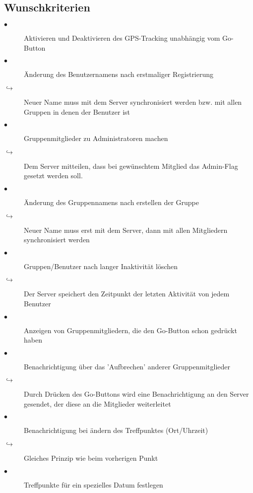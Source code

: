 \subsection{Wunschkriterien}
\begin{description}
\item[$\bullet$] Aktivieren und Deaktivieren des GPS-Tracking unabhängig vom Go-Button
\item[$\bullet$] Änderung des Benutzernamens nach erstmaliger Registrierung
\item[$\hookrightarrow$] Neuer Name muss mit dem Server synchronisiert werden bzw. mit allen Gruppen in denen der Benutzer ist
\item[$\bullet$] Gruppenmitglieder zu Administratoren machen
\item[$\hookrightarrow$] Dem Server mitteilen, dass bei gewünschtem Mitglied das Admin-Flag gesetzt werden soll.
\item[$\bullet$] Änderung des Gruppennamens nach erstellen der Gruppe
\item[$\hookrightarrow$] Neuer Name muss erst mit dem Server, dann mit allen Mitgliedern synchronisiert werden
\item[$\bullet$] Gruppen/Benutzer nach langer Inaktivität löschen
\item[$\hookrightarrow$] Der Server speichert den Zeitpunkt der letzten Aktivität von jedem Benutzer
\item[$\bullet$] Anzeigen von Gruppenmitgliedern, die den Go-Button schon gedrückt haben
\item[$\bullet$] Benachrichtigung über das 'Aufbrechen' anderer Gruppenmitglieder
\item[$\hookrightarrow$] Durch Drücken des Go-Buttons wird eine Benachrichtigung an den Server gesendet, der diese an die Mitglieder weiterleitet
\item[$\bullet$] Benachrichtigung bei ändern des Treffpunktes (Ort/Uhrzeit)
\item[$\hookrightarrow$] Gleiches Prinzip wie beim vorherigen Punkt
\item[$\bullet$] Treffpunkte für ein spezielles Datum festlegen
\end{description}
